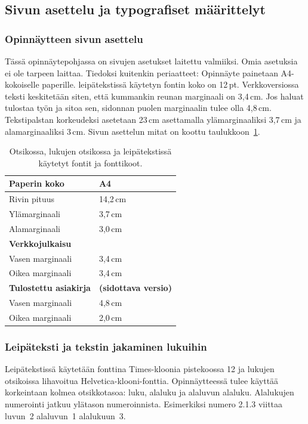 \documentclass[finnish, 12pt, a4paper, arts, utf8, a-2b, online]{aaltothesis}
\begin{document}
\subsection*{Sivun asettelu ja typografiset määrittelyt}
\subsubsection*{Opinnäytteen sivun asettelu}

Tässä opinnäytepohjassa on sivujen asetukset laitettu valmiiksi. Omia asetuksia
ei ole tarpeen laittaa. Tiedoksi kuitenkin periaatteet: Opinnäyte painetaan 
A4-kokoiselle paperille. leipätekstissä käytetyn fontin koko on 12\,pt. 
Verkkoversiossa teksti keskitetään siten, että kummankin reunan marginaali on 
3,4\,cm. Jos haluat tulostaa työn ja sitoa sen, sidonnan puolen marginaalin 
tulee olla 4,8\,cm. Tekstipalstan korkeudeksi asetetaan 23\,cm asettamalla 
ylämarginaaliksi 3,7\,cm ja alamarginaaliksi 3\,cm. Sivun asettelun mitat on 
koottu taulukkoon~\ref{liitetau:asemointi}.

\begin{table}[htb]
	\centering
	\caption{Otsikossa, lukujen otsikossa ja leipätekstissä käytetyt fontit ja fonttikoot.}
	\label{liitetau:asemointi}
	\sffamily%
	\begin{tabular}{ll}
		\hline
		Paperin koko & A4\\\hline
		Rivin pituus & 14,2\,cm \\\hline
		Ylämarginaali & 3,7\,cm \\\hline
		Alamarginaali & 3,0\,cm \\\hline
		\textbf{Verkkojulkaisu} & \\\hline
		Vasen marginaali & 3,4\,cm \\\hline
		Oikea marginaali & 3,4\,cm \\\hline
		\textbf{Tulostettu asiakirja} & \textbf{(sidottava versio)} \\\hline
		Vasen marginaali & 4,8\,cm \\\hline
		Oikea marginaali & 2,0\,cm \\\hline
	\end{tabular}
\end{table}

\subsubsection*{Leipäteksti ja tekstin jakaminen lukuihin}

Leipätekstissä käytetään fonttina Times-kloonia pistekoossa 12 ja lukujen 
otsikoissa lihavoitua Helvetica-klooni-fonttia. Opinnäytteessä tulee käyttää 
korkeintaan kolmea otsikkotasoa: luku, alaluku ja alaluvun alaluku. Alalukujen 
numerointi jatkuu ylätason numeroinnista. Esimerkiksi numero 2.1.3 viittaa 
luvun~2 alaluvun~1 alalukuun~3.
\end{document}
